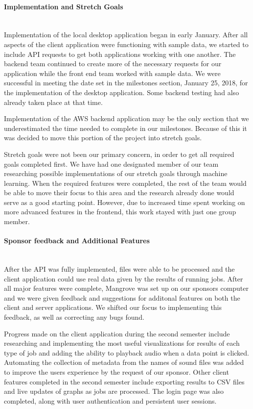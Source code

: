 \paragraph{Implementation and Stretch Goals} \mbox{}\\[\paragraphheaderspace]
Implementation of the local desktop application began in early January. After all aspects of the client application were functioning with sample data, we started to include API requests to get both applications working with one another. The backend team continued to create more of the necessary requests for our application while the front end team worked with sample data. We were successful in meeting the date set in the milestones section, January 25, 2018, for the implementation of the desktop application. Some backend testing had also already taken place at that time.\par
Implementation of the AWS backend application may be the only section that we underestimated the time needed to complete in our milestones. Because of this it was decided to move this portion of the project into stretch goals.\par
Stretch goals were not been our primary concern, in order to get all required goals completed first. We have had one designated member of our team researching possible implementations of our stretch goals through machine learning. When the required features were completed, the rest of the team would be able to move their focus to this area and the research already done would serve as a good starting point. However, due to increased time spent working on more advanced features in the frontend, this work stayed with just one group member.\par

\paragraph{Sponsor feedback and Additional Features} \mbox{}\\[\paragraphheaderspace]
After the API was fully implemented, files were able to be processed and the client application could use real data given by the results of running jobs. After all major features were complete, Mangrove was set up on our sponsor\textquotesingle s computer and we were given feedback and suggestions for additonal features on both the client and server applications. We shifted our focus to implementing this feedback, as well as correcting any bugs found.\par
Progress made on the client application during the second semester include researching and implementing the most useful visualizations for results of each type of job and adding the ability to playback audio when a data point is clicked. Automating the collection of metadata from the names of sound files was added to improve the user\textquotesingle s experience by the request of our sponsor. Other client features completed in the second semester include exporting results to CSV files and live updates of graphs as jobs are processed. The login page was also completed, along with user authentication and persistent user sessions.\par